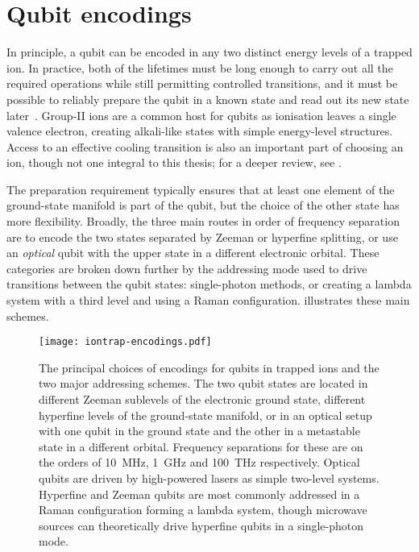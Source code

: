 \section{Qubit encodings}

In principle, a qubit can be encoded in any two distinct energy levels of a trapped ion.
In practice, both of the lifetimes must be long enough to carry out all the required operations while still permitting controlled transitions, and it must be possible to reliably prepare the qubit in a known state and read out its new state later~\cite{DiVincenzo2000}.
Group-II ions are a common host for qubits as ionisation leaves a single valence electron, creating alkali-like states with simple energy-level structures.
Access to an effective cooling transition is also an important part of choosing an ion, though not one integral to this thesis; for a deeper review, see .

The preparation requirement typically ensures that at least one element of the ground-state manifold is part of the qubit, but the choice of the other state has more flexibility.
Broadly, the three main routes in order of frequency separation are to encode the two states separated by Zeeman or hyperfine splitting, or use an \emph{optical} qubit with the upper state in a different electronic orbital.
These categories are broken down further by the addressing mode used to drive transitions between the qubit states: single-photon methods, or creating a lambda system with a third level and using a Raman configuration.
 illustrates these main schemes.

\begin{figure}%
    \texttt{[image: iontrap-encodings.pdf]}%
    \caption[Trapped-ion qubit encodings and addressing schemes]{\label{fig:iontrap-qubit-encodings}%
        The principal choices of encodings for qubits in trapped ions and the two major addressing schemes.
        The two qubit states are located in different Zeeman sublevels of the electronic ground state, different hyperfine levels of the ground-state manifold, or in an optical setup with one qubit in the ground state and the other in a metastable state in a different orbital.
        Frequency separations for these are on the orders of \qty{10}{\mega\Hz}, \qty{1}{\giga\Hz} and \qty{100}{\tera\Hz} respectively.
        Optical qubits are driven by high-powered lasers as simple two-level systems.
        Hyperfine and Zeeman qubits are most commonly addressed in a Raman configuration forming a lambda system, though microwave sources can theoretically drive hyperfine qubits in a single-photon mode.
    }%
\end{figure}

